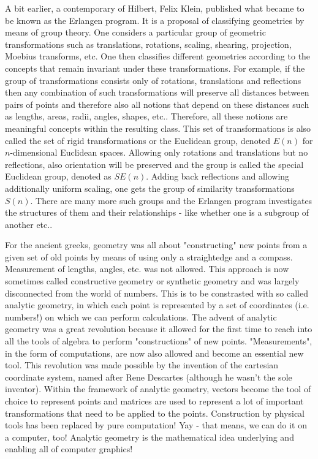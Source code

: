 \medskip
A bit earlier, a contemporary of Hilbert, Felix Klein, published what became to be known as the Erlangen program. It is a proposal of classifying geometries by means of group theory. One considers a particular group of geometric transformations such as translations, rotations, scaling, shearing, projection, Moebius transforms, etc. One then classifies different geometries according to the concepts that remain invariant under these transformations. For example, if the group of transformations consists only of rotations, translations and reflections then any combination of such transformations will preserve all distances between pairs of points and therefore also all notions that depend on these distances such as lengths, areas, radii, angles, shapes, etc.. Therefore, all these notions are meaningful concepts within the resulting class. This set of transformations is also called the set of rigid transformations or the Euclidean group, denoted $E(n)$ for $n$-dimensional Euclidean spaces. Allowing only rotations and translations but no reflections, also orientation will be preserved and the group is called the special Euclidean group, denoted as $SE(n)$. Adding back reflections and allowing additionally uniform scaling, one gets the group of similarity transformations $S(n)$. There are many more such groups and the Erlangen program investigates the structures of them and their relationships - like whether one is a subgroup of another etc..

\medskip
For the ancient greeks, geometry was all about "constructing" new points from a given set of old points by means of using only a straightedge and a compass. Measurement of lengths, angles, etc. was not allowed. This approach is now sometimes called constructive geometry or synthetic geometry and was largely disconnected from the world of numbers. This is to be constrasted with so called analytic geometry, in which each point is represented by a set of coordinates (i.e. numbers!) on which we can perform calculations. The advent of analytic geometry was a great revolution because it allowed for the first time to reach into all the tools of algebra to perform "constructions" of new points. "Measurements", in the form of computations, are now also allowed and become an essential new tool. This revolution was made possible by the invention of the cartesian coordinate system, named after Rene Descartes (although he wasn't the sole inventor). Within the framework of analytic geometry, vectors become the tool of choice to represent points and matrices are used to represent a lot of important transformations that need to be applied to the points. Construction by physical tools has been replaced by pure computation! Yay - that means, we can do it on a computer, too! Analytic geometry is the mathematical idea underlying and enabling all of computer graphics!


